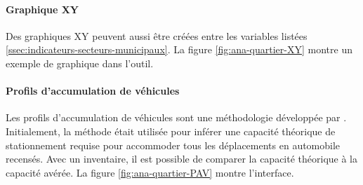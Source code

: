 \paragraph{Graphique XY} Des graphiques XY peuvent aussi être créées entre les variables listées \ref{ssec:indicateurs-secteurs-municipaux}. La figure \ref{fig:ana-quartier-XY} montre un exemple de graphique dans l'outil.
\paragraph{Profils d'accumulation de véhicules} Les profils d'accumulation de véhicules sont une méthodologie développée par \parencite{diallo_methodology_2015}. Initialement, la méthode était utilisée pour inférer une capacité théorique de stationnement requise pour accommoder tous les déplacements en automobile recensés. Avec un inventaire, il est possible de comparer la capacité théorique à la capacité avérée. La figure \ref{fig:ana-quartier-PAV} montre l'interface.
